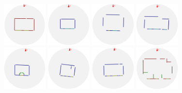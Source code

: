 \documentclass[review]{vgtc}                 %
\begin{document}
\begin{figure}[t]
\begin{minipage}[c]{4.9in}
  \includegraphics[width=0.9in]{images/section3/0_2D_walls_rotate_edit} %
  \includegraphics[width=0.9in]{images/section3/6_2D_walls_rotate} %
  \includegraphics[width=0.9in]{images/section3/7_2D_walls_rotate} %
  \includegraphics[width=0.9in]{images/section3/8_2D_walls_rotate}\\ %
  \includegraphics[width=0.9in]{images/section3/2_2D_walls_rotate} %
  \includegraphics[width=0.9in]{images/section3/3_2D_walls_rotate} %
  \includegraphics[width=0.9in]{images/section3/4_2D_walls_rotate} %
  \includegraphics[width=0.9in]{images/section3/9_2D_walls_rotate} %

\end{minipage}
\end{figure}
\end{document}
